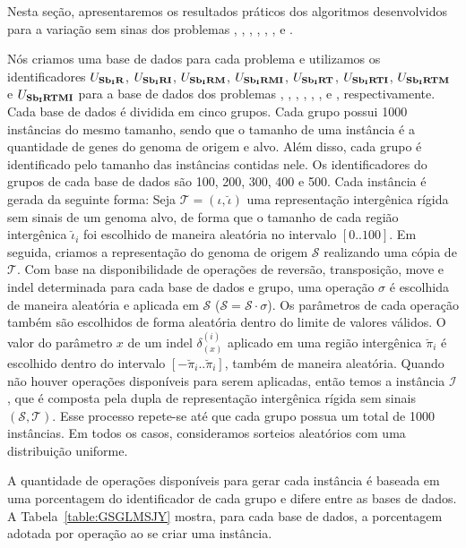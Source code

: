 Nesta seção, apresentaremos os resultados práticos dos algoritmos desenvolvidos para a variação sem sinas dos problemas \SbIR{}, \SbIRI{}, \SbIRM{}, \SbIRMI{}, \SbIRT{}, \SbIRTI{}, \SbIRTM{} e \SbIRTMI{}.

Nós criamos uma base de dados para cada problema e utilizamos os identificadores $U_{\textbf{Sb\textsubscript{I}R}}{}$, $U_{\textbf{Sb\textsubscript{I}RI}}{}$, $U_{\textbf{Sb\textsubscript{I}RM}}{}$, $U_{\textbf{Sb\textsubscript{I}RMI}}{}$, $U_{\textbf{Sb\textsubscript{I}RT}}{}$, $U_{\textbf{Sb\textsubscript{I}RTI}}{}$, $U_{\textbf{Sb\textsubscript{I}RTM}}{}$ e $U_{\textbf{Sb\textsubscript{I}RTMI}}{}$ para a base de dados dos problemas \SbIR{}, \SbIRI{}, \SbIRM{}, \SbIRMI{}, \SbIRT{}, \SbIRTI{}, \SbIRTM{} e \SbIRTMI{}, respectivamente. Cada base de dados é dividida em cinco grupos. Cada grupo possui 1000 instâncias do mesmo tamanho, sendo que o tamanho de uma instância é a quantidade de genes do genoma de origem e alvo. Além disso, cada grupo é identificado pelo tamanho das instâncias contidas nele. Os identificadores do grupos de cada base de dados são 100, 200, 300, 400 e 500. Cada instância é gerada da seguinte forma: Seja $\mathcal{T} = (\iota,\breve\iota)$ uma representação intergênica rígida sem sinais de um genoma alvo, de forma que o tamanho de cada região intergênica $\breve\iota_i$ foi escolhido de maneira aleatória no intervalo $[0..100]$. Em seguida, criamos a representação do genoma de origem $\mathcal{S}$ realizando uma cópia de $\mathcal{T}$. Com base na disponibilidade de operações de reversão, transposição, move e indel determinada para cada base de dados e grupo, uma operação $\sigma$ é escolhida de maneira aleatória e aplicada em $\mathcal{S}$ ($\mathcal{S} = \mathcal{S} \cdot \sigma$). Os parâmetros de cada operação também são escolhidos de forma aleatória dentro do limite de valores válidos. O valor do parâmetro $x$ de um indel $\delta^{(i)}_{(x)}$ aplicado em uma região intergênica $\breve\pi_{i}$ é escolhido dentro do intervalo $[-\breve\pi_{i}..\breve\pi_{i}]$, também de maneira aleatória. Quando não houver operações disponíveis para serem aplicadas, então temos a instância $\mathcal{I}$, que é composta pela dupla de representação intergênica rígida sem sinais $(\mathcal{S},\mathcal{T})$. Esse processo repete-se até que cada grupo possua um total de 1000 instâncias. Em todos os casos, consideramos sorteios aleatórios com uma distribuição uniforme.

A quantidade de operações disponíveis para gerar cada instância é baseada em uma porcentagem do identificador de cada grupo e difere entre as bases de dados. A Tabela~\ref{table:GSGLMSJY} mostra, para cada base de dados, a porcentagem adotada por operação ao se criar uma instância.

